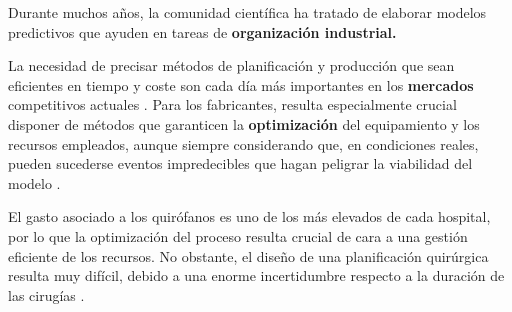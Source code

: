 
Durante muchos años, la comunidad científica ha tratado de elaborar modelos predictivos que ayuden en tareas de \textbf{organización industrial.}

La necesidad de precisar métodos de planificación y producción que sean eficientes en tiempo y coste son cada día más importantes en los \textbf{mercados} competitivos actuales \cite{Geurtsen2023ProductionReview}. Para los fabricantes, resulta especialmente crucial disponer de métodos que garanticen la \textbf{optimización} del equipamiento y los recursos empleados, aunque siempre considerando que, en condiciones reales, pueden sucederse eventos impredecibles que hagan peligrar la viabilidad del modelo \cite{Geurtsen2023ProductionReview}.

El gasto asociado a los quirófanos es uno de los más elevados de cada hospital, por lo que la optimización del proceso resulta crucial de cara a una gestión eficiente de los recursos.
No obstante, el diseño de una planificación quirúrgica resulta muy difícil, debido a una enorme incertidumbre respecto a la duración de las cirugías \cite{Celik2023APrinciple}.

